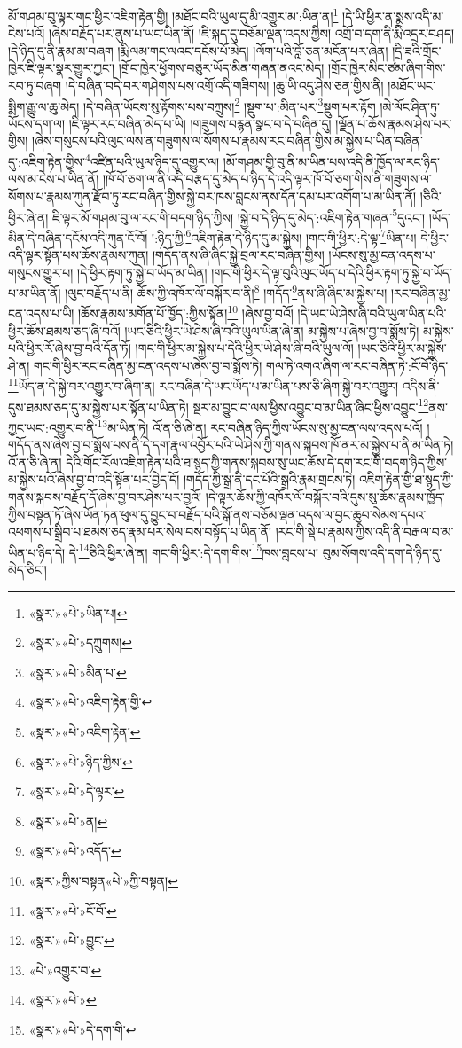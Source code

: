 མོ་གཤམ་བུ་ལྟར་གང་ཕྱིར་འཇིག་རྟེན་གྱི། །མཐོང་བའི་ཡུལ་དུ་མི་འགྱུར་མ་:ཡིན་ན།\footnote{«སྣར་»«པེ་»ཡིན་པ།} །དེ་ཡི་ཕྱིར་ན་སྨྲས་འདི་མ་ངེས་པའོ། །ཞེས་བརྗོད་པར་ནུས་པ་ཡང་ཡིན་ནོ། །ཇི་སྐད་དུ་བཅོམ་ལྡན་འདས་ཀྱིས། འགྲོ་བ་དག་ནི་རྨི་འདྲར་བཤད། །དེ་ཉིད་དུ་ནི་རྣམ་མ་བཞག །རྨི་ལམ་གང་ལའང་དངོས་པོ་མེད། །ལོག་པའི་བློ་ཅན་མངོན་པར་ཞེན། །དྲི་ཟའི་གྲོང་ཁྱེར་ཇི་ལྟར་སྣར་གྱུར་ཀྱང་། །གྲོང་ཁྱེར་ཕྱོགས་བཅུར་ཡོད་མིན་གཞན་ནའང་མེད། །གྲོང་ཁྱེར་མིང་ཙམ་ཞིག་གིས་རབ་ཏུ་བཞག །དེ་བཞིན་བདེ་བར་གཤེགས་པས་འགྲོ་འདི་གཟིགས། །ཆུ་ཡི་འདུ་ཤེས་ཅན་གྱིས་ནི། །མཐོང་ཡང་སྨིག་རྒྱུ་ལ་ཆུ་མེད། །དེ་བཞིན་ཡོངས་སུ་རྟོགས་པས་བཀྲུས།\footnote{«སྣར་»«པེ་»དཀྲུགས།} །སྡུག་པ་:མིན་པར་\footnote{«སྣར་»«པེ་»མིན་པ་}སྡུག་པར་རྟོག །མེ་ལོང་ཤིན་ཏུ་ཡོངས་དག་ལ། །ཇི་ལྟར་རང་བཞིན་མེད་པ་ཡི། །གཟུགས་བརྙན་སྣང་བ་དེ་བཞིན་དུ། །ལྗོན་པ་ཆོས་རྣམས་ཤེས་པར་གྱིས། །ཞེས་གསུངས་པའི་ལུང་ལས་ན་གཟུགས་ལ་སོགས་པ་རྣམས་རང་བཞིན་གྱིས་མ་སྐྱེས་པ་ཡིན་བཞིན་དུ་:འཇིག་རྟེན་གྱིས་\footnote{«སྣར་»«པེ་»འཇིག་རྟེན་གྱི་}འཛིན་པའི་ཡུལ་ཉིད་དུ་འགྱུར་ལ། །མོ་གཤམ་གྱི་བུ་ནི་མ་ཡིན་པས་འདི་ནི་ཁྱོད་ལ་རང་ཉིད་ལས་མ་ངེས་པ་ཡིན་ནོ། །ཁོ་བོ་ཅག་ལ་ནི་འདི་བརྩད་དུ་མེད་པ་ཉིད་དེ་འདི་ལྟར་ཁོ་བོ་ཅག་གིས་ནི་གཟུགས་ལ་སོགས་པ་རྣམས་ཀུན་རྫོབ་ཏུ་རང་བཞིན་གྱིས་སྐྱེ་བར་ཁས་བླངས་ནས་དོན་དམ་པར་འགོག་པ་མ་ཡིན་ནོ། །ཅིའི་ཕྱིར་ཞེ་ན། ཇི་ལྟར་མོ་གཤམ་བུ་ལ་རང་གི་བདག་ཉིད་ཀྱིས། །སྐྱེ་བ་དེ་ཉིད་དུ་མེད་:འཇིག་རྟེན་གཞན་\footnote{«སྣར་»«པེ་»འཇིག་རྟེན་}དུའང་། །ཡོད་མིན་དེ་བཞིན་དངོས་འདི་ཀུན་ངོ་བོ། །:ཉིད་ཀྱི་\footnote{«སྣར་»«པེ་»ཉིད་ཀྱིས་}འཇིག་རྟེན་དེ་ཉིད་དུ་མ་སྐྱེས། །གང་གི་ཕྱིར་:དེ་ལྟ་\footnote{«སྣར་»«པེ་»དེ་ལྟར་}ཡིན་པ། དེ་ཕྱིར་འདི་ལྟར་སྟོན་པས་ཆོས་རྣམས་ཀུན། །གདོད་ནས་ཞི་ཞིང་སྐྱེ་བྲལ་རང་བཞིན་གྱིས། །ཡོངས་སུ་མྱ་ངན་འདས་པ་གསུངས་གྱུར་པ། །དེ་ཕྱིར་རྟག་ཏུ་སྐྱེ་བ་ཡོད་མ་ཡིན། །གང་གི་ཕྱིར་དེ་ལྟ་བུའི་ལུང་ཡོད་པ་དེའི་ཕྱིར་རྟག་ཏུ་སྐྱེ་བ་ཡོད་པ་མ་ཡིན་ནོ། །ལུང་བརྗོད་པ་ནི། ཆོས་ཀྱི་འཁོར་ལོ་བསྐོར་བ་ནི།\footnote{«སྣར་»«པེ་»ན།} །གདོད་\footnote{«སྣར་»«པེ་»འདོད་}ནས་ཞི་ཞིང་མ་སྐྱེས་པ། །རང་བཞིན་མྱ་ངན་འདས་པ་ཡི། །ཆོས་རྣམས་མགོན་པོ་ཁྱོད་:ཀྱིས་སྟོན།\footnote{«སྣར་»ཀྱིས་བསྟན«པེ་»ཀྱི་བསྟན།} །ཞེས་བྱ་བའོ། །དེ་ཡང་ཡེ་ཤེས་ཞི་བའི་ཡུལ་ཡིན་པའི་ཕྱིར་ཆོས་ཐམས་ཅད་ཞི་བའོ། །ཡང་ཅིའི་ཕྱིར་ཡེ་ཤེས་ཞི་བའི་ཡུལ་ཡིན་ཞེ་ན། མ་སྐྱེས་པ་ཞེས་བྱ་བ་སྨོས་ཏེ། མ་སྐྱེས་པའི་ཕྱིར་རོ་ཞེས་བྱ་བའི་དོན་ཏོ། །གང་གི་ཕྱིར་མ་སྐྱེས་པ་དེའི་ཕྱིར་ཡེ་ཤེས་ཞི་བའི་ཡུལ་ལོ། །ཡང་ཅིའི་ཕྱིར་མ་སྐྱེས་ཤེ་ན། གང་གི་ཕྱིར་རང་བཞིན་མྱ་ངན་འདས་པ་ཞེས་བྱ་བ་སྨོས་ཏེ། གལ་ཏེ་འགའ་ཞིག་ལ་རང་བཞིན་ཏེ་:ངོ་བོ་ཉིད་\footnote{«སྣར་»«པེ་»ངོ་བོ་}ཡོད་ན་དེ་སྐྱེ་བར་འགྱུར་བ་ཞིག་ན། རང་བཞིན་དེ་ཡང་ཡོད་པ་མ་ཡིན་པས་ཅི་ཞིག་སྐྱེ་བར་འགྱུར། འདིས་ནི་དུས་ཐམས་ཅད་དུ་མ་སྐྱེས་པར་སྟོན་པ་ཡིན་ཏེ། སྔར་མ་བྱུང་བ་ལས་ཕྱིས་འབྱུང་བ་མ་ཡིན་ཞིང་ཕྱིས་འབྱུང་\footnote{«སྣར་»«པེ་»བྱུང་}ནས་ཀྱང་ཡང་:འགྱུར་བ་ནི་\footnote{«པེ་»འགྱུར་བ་}མ་ཡིན་ཏེ། འོ་ན་ཅི་ཞེ་ན། རང་བཞིན་ཉིད་ཀྱིས་ཡོངས་སུ་མྱ་ངན་ལས་འདས་པའོ། །གདོད་ནས་ཞེས་བྱ་བ་སྨོས་པས་ནི་དེ་དག་རྣལ་འབྱོར་པའི་ཡེ་ཤེས་ཀྱི་གནས་སྐབས་ཁོ་ནར་མ་སྐྱེས་པ་ནི་མ་ཡིན་ཏེ། འོ་ན་ཅི་ཞེ་ན། དེའི་གོང་རོལ་འཇིག་རྟེན་པའི་ཐ་སྙད་ཀྱི་གནས་སྐབས་སུ་ཡང་ཆོས་དེ་དག་རང་གི་བདག་ཉིད་ཀྱིས་མ་སྐྱེས་པའོ་ཞེས་བྱ་བ་འདི་སྟོན་པར་བྱེད་དོ། །གདོད་ཀྱི་སྒྲ་ནི་དང་པོའི་སྒྲའི་རྣམ་གྲངས་ཏེ། འཇིག་རྟེན་གྱི་ཐ་སྙད་ཀྱི་གནས་སྐབས་བརྗོད་དོ་ཞེས་བྱ་བར་ཤེས་པར་བྱའོ། །དེ་ལྟར་ཆོས་ཀྱི་འཁོར་ལོ་བསྐོར་བའི་དུས་སུ་ཆོས་རྣམས་ཁྱོད་ཀྱིས་བསྟན་ཏོ་ཞེས་ཡོན་ཏན་ཕུལ་དུ་བྱུང་བ་བརྗོད་པའི་སྒོ་ནས་བཅོམ་ལྡན་འདས་ལ་བྱང་ཆུབ་སེམས་དཔའ་འཕགས་པ་སྒྲིབ་པ་ཐམས་ཅད་རྣམ་པར་སེལ་བས་བསྟོད་པ་ཡིན་ནོ། །རང་གི་སྡེ་པ་རྣམས་ཀྱིས་འདི་ནི་བརྒལ་བ་མ་ཡིན་པ་ཉིད་དེ། དེ་\footnote{«སྣར་»«པེ་»}ཅིའི་ཕྱིར་ཞེ་ན། གང་གི་ཕྱིར་:དེ་དག་གིས་\footnote{«སྣར་»«པེ་»དེ་དག་གི་}ཁས་བླངས་པ། བུམ་སོགས་འདི་དག་དེ་ཉིད་དུ་མེད་ཅིང་། 